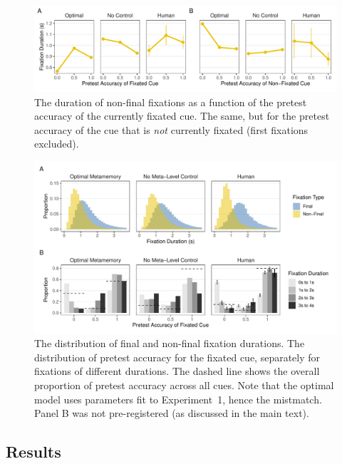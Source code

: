 \begin{figure}[ht]
  \includegraphics[scale=.65]{figs/memory/exp2/nonfinal.pdf}
  \caption{
     The duration of non-final fixations as a function of the pretest accuracy of the currently fixated cue.
     The same, but for the pretest accuracy of the cue that is \emph{not} currently fixated (first fixations excluded).
  \label{fig:nonfinal}
}
\end{figure}

\begin{figure}[ht]
  \includegraphics[scale=.65]{figs/memory/exp2/commitment.pdf}
  \caption{
     The distribution of final and non-final fixation durations.
     The distribution of pretest accuracy for the fixated cue, separately for fixations of different durations. The dashed line shows the overall proportion of pretest accuracy across all cues. Note that the optimal model uses parameters fit to Experiment~1, hence the mistmatch. Panel B was not pre-registered (as discussed in the main text).
  \label{fig:commitment}
}
\end{figure}

\subsection{Results}

